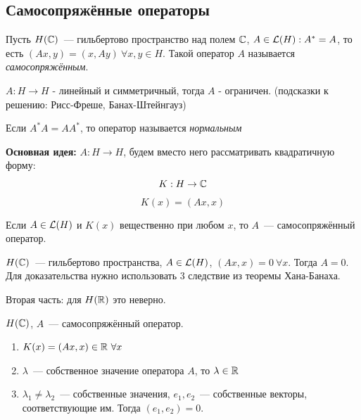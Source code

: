 \subsection{Самосопряжённые операторы}

\begin{definition}
Пусть $H(\mathbb{C})$~--- гильбертово пространство над полем $\mathbb{C}$,
$A \in \mathcal{L}(H) : A^* = A$, то есть $(Ax, y) = (x, Ay)\ \forall x, y \in H$.
Такой оператор $A$ называется \textit{самосопряжённым}.
\end{definition}

\begin{exercise}
 $A: H \to H$ - линейный и симметричный, тогда $A$ - ограничен. (подсказки к решению: Рисс-Фреше, Банах-Штейнгауз)
\end{exercise}

\begin{definition}
    Если $A^*A=AA^*$, то оператор называется \textit{нормальным}
\end{definition}



\textbf{Основная идея:} $A: H \to H$, будем вместо него рассматривать квадратичную форму:
\[ K: H \to \mathbb{C} \]
\[ K(x)=(Ax, x) \]

\begin{exercise}
    Если $A \in \mathcal{L}(H)$ и $K(x)$ вещественно при любом $x$, то $A$~---
    самосопряжённый оператор.
\end{exercise}


\begin{exercise}
$H(\mathbb{C})$~--- гильбертово пространства, $A \in \mathcal{L}(H)$,
$(Ax, x) = 0\ \forall x$. Тогда $A = 0$.
Для доказательства нужно использовать 3 следствие из теоремы Хана-Банаха.

Вторая часть: для $H(\mathbb{R})$ это неверно.
\end{exercise}


\begin{theorem}[11.1]\label{11.1}
$H(\mathbb{C})$, $A$~--- самосопряжённый оператор.
\begin{enumerate}
    \item $K(x) = (Ax, x) \in \mathbb{R} \ \forall x$
    \item $\lambda$~--- собственное значение оператора $A$, 
    то $\lambda \in \mathbb{R}$
    \item $\lambda_1 \neq \lambda_2$~--- собственные значения, 
    $e_1, e_2$~--- собственные векторы, соответствующие им. 
    Тогда $(e_1, e_2) = 0$.
\end{enumerate}
\end{theorem}

